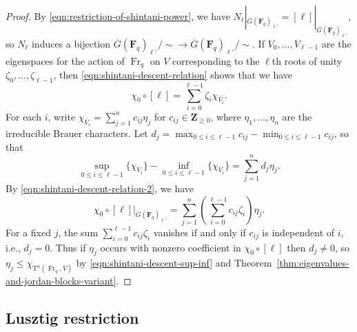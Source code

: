 \documentclass[reqno]{amsart}
\numberwithin{equation}{subsection}
\newcommand{\F}{\mathbf{F}}
\newcommand{\Z}{\mathbf{Z}}
\newcommand{\ol}[1]{\overline{#1}}
\DeclareMathOperator{\GL}{GL}
\DeclareMathOperator{\Fr}{Fr}
\newcommand{\rT}{\ensuremath{\mathrm{T}}\xspace}
\theoremstyle{remark}
\newtheorem{remark}[thm]{Remark}
\numberwithin{equation}{subsection}
\numberwithin{figure}{subsection}
\begin{document}
\begin{proof}
    By \eqref{eqn:restriction-of-shintani-power}, we have $N_\ell|_{\ol G(\F_q)_{\ell'}} = [\ell]|_{\ol G(\F_q)_{\ell'}}$, so $N_\ell$ induces a bijection $\ol G(\F_q)_{\ell'}/{\sim} \to \ol G(\F_q)_{\ell'}/{\sim}$. If $V_0, \dots, V_{\ell-1}$ are the eigenspaces for the action of $\Fr_q$ on $V$ corresponding to the $\ell$th roots of unity $\zeta_0, \dots, \zeta_{\ell-1}$, then \eqref{eqn:shintani-descent-relation} shows that we have
    \begin{equation}\label{eqn:shintani-descent-relation-2}
    \chi_0 \circ [\ell] = \sum_{i=0}^{\ell-1} \zeta_i\chi_{\ol V_i}.
    \end{equation}
    For each $i$, write $\chi_{\ol V_i} = \sum_{j=1}^n c_{ij}\eta_j$ for $c_{ij} \in \Z_{\geq 0}$, where $\eta_1, \dots, \eta_n$ are the irreducible Brauer characters. Let $d_j = \max_{0 \leq i \leq \ell-1} c_{ij} - \min_{0 \leq i \leq \ell-1} c_{ij}$, so that
    \begin{equation}\label{eqn:shintani-descent-sup-inf}
    \sup_{0 \leq i \leq \ell-1}\{\chi_{\ol V_i}\} - \inf_{0 \leq i \leq \ell-1}\{\chi_{\ol V_i}\} = \sum_{j=1}^n d_j \eta_j.
    \end{equation}
    By \eqref{eqn:shintani-descent-relation-2}, we have
    \[
    \chi_0 \circ [\ell]|_{\ol G(\F_q)_{\ell'}} = \sum_{j=1}^{n} \left(\sum_{i=0}^{\ell-1} c_{ij}\zeta_i\right)\eta_j.
    \]
    For a fixed $j$, the sum $\sum_{i=0}^{\ell-1} c_{ij}\zeta_i$ vanishes if and only if $c_{ij}$ is independent of $i$, i.e., $d_j = 0$. Thus if $\eta_j$ occurs with nonzero coefficient in $\chi_0 \circ [\ell]$ then $d_j \neq 0$, so $\eta_j \leq \chi_{\rT^a(\Fr_q, \ol V)}$ by \eqref{eqn:shintani-descent-sup-inf} and Theorem~\ref{thm:eigenvalues-and-jordan-blocks-variant}.
\end{proof}






\subsection{Lusztig restriction}
\end{document}
